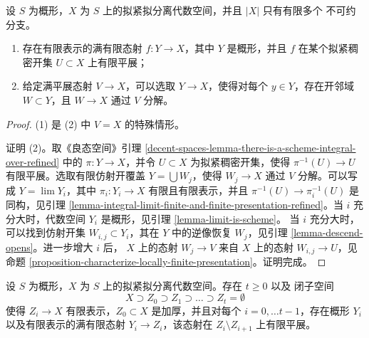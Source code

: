 \begin{lemma}
\label{lemma-there-is-a-scheme-finite-over-refined}
设 $S$ 为概形，$X$ 为 $S$ 上的拟紧拟分离代数空间，并且 $|X|$ 只有有限多个
不可约分支。
\begin{enumerate}
\item 存在有限表示的满有限态射 $f : Y \to X$，其中 $Y$ 是概形，并且
$f$ 在某个拟紧稠密开集 $U \subset X$ 上有限平展；
\item 给定满平展态射 $V \to X$，可以选取 $Y \to X$，使得对每个
$y \in Y$，存在开邻域 $W \subset Y$，且 $W \to X$ 通过 $V$ 分解。
\end{enumerate}
\end{lemma}

\begin{proof}
(1) 是 (2) 中 $V = X$ 的特殊情形。

\medskip\noindent
证明 (2)。取《良态空间》引理
\ref{decent-spaces-lemma-there-is-a-scheme-integral-over-refined} 中的
$\pi : Y \to X$，并令 $U \subset X$ 为拟紧稠密开集，使得
$\pi^{-1}(U) \to U$ 有限平展。选取有限仿射开覆盖
$Y = \bigcup W_j$，使得 $W_j \to X$ 通过 $V$ 分解。可以写成
$Y = \lim Y_i$，其中 $\pi_i : Y_i \to X$ 有限且有限表示，并且
$\pi^{-1}(U) \to \pi_i^{-1}(U)$ 是同构，见引理
\ref{lemma-integral-limit-finite-and-finite-presentation-refined}。当 $i$
充分大时，代数空间 $Y_i$ 是概形，见引理 \ref{lemma-limit-is-scheme}。
当 $i$ 充分大时，可以找到仿射开集 $W_{i, j} \subset Y_i$，其在 $Y$
中的逆像恢复 $W_j$，见引理 \ref{lemma-descend-opens}。进一步增大 $i$ 后，
$X$ 上的态射 $W_j \to V$ 来自 $X$ 上的态射
$W_{i, j} \to U$，见命题
\ref{proposition-characterize-locally-finite-presentation}。证明完成。
\end{proof}

\begin{lemma}
\label{lemma-there-is-a-scheme-finite-over-filtered}
设 $S$ 为概形，$X$ 为 $S$ 上的拟紧拟分离代数空间。存在 $t \geq 0$ 以及
闭子空间
$$
X \supset Z_0 \supset Z_1 \supset \ldots \supset Z_t = \emptyset
$$
使得 $Z_i \to X$ 有限表示，$Z_0 \subset X$ 是加厚，并且对每个
$i = 0, \ldots t - 1$，存在概形 $Y_i$ 以及有限表示的满有限态射
$Y_i \to Z_i$，该态射在 $Z_i \setminus Z_{i + 1}$ 上有限平展。
\end{lemma}

